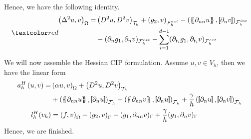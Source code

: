 Hence, we have the following identity.
\begin{equation}
\label{eq:bi_basic_dg_full_1}
\red{
\begin{split}
    \left( \Delta  ^{2} u, v \right) _{\Omega }  =&   \left( D^2u, D^2v \right)_{\mathcal{T} _{h}} +  \left(g_{2}, v  \right) _{\mathcal{F}^{ext}_{h} }  -  ( \mean{ \partial _{nn} u }   , \jump{ \partial_{n} v } )_{\mathcal{F}_{h}^{int} } \\
                                                  & - ( \partial _{n} g_{1} , \partial _{n} v)_{\mathcal{F}^{ext}_{h} } - \sum_{i =1  }^{d-1} ( \partial   _{t_{i}} g_{1}  ,  \partial   _{t_{i}}  v  )_{ \mathcal{F}^{ext} _{h}  }
\end{split}
}
\end{equation}


We will now assemble the Hessian CIP formulation. Assume $u,v \in V_{h}$, then we have the linear form
\begin{equation}
\begin{split}
a_{h}^{H} \left( u, v \right)   =&
    \left( \alpha  u, v \right) _{\Omega }   +  \left( D^2 u, D^2v \right) _{\mathcal{T} _{h}} \\
 & +
  \left( \mean{  \partial _{n n} u }, \jump{ \partial _{n }u} \right)_{\mathcal{F}_{h}}  +
 \left( \mean{ \partial _{n n} v }, \jump{ \partial _{n}u }      \right)_{\mathcal{F}_{h}}  + \frac{\gamma }{h}  \left( \jump{ \partial _{n} u}, \jump{ \partial _{n} v   }   \right)_{\mathcal{F}_{h}} \\
 l_{h}^{H}( v_{h}) & =  \left( f, v \right) _{\Omega }  - \left(g_{2}, v  \right) _{\Gamma } - ( g_{1}, \partial _{nn} v)_{\Gamma } +  \frac{\gamma }{h} ( g_{1} , \partial _{n} v)_{\Gamma }
\end{split}
\end{equation}
Hence, we are finished.

